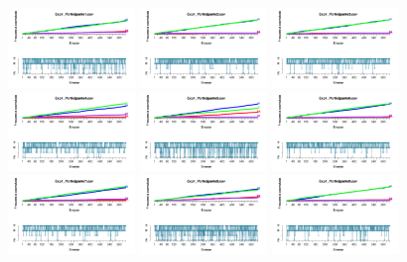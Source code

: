 \begin{figure}[th]
\centering
\includegraphics[width=0.30\textwidth]{Figures/Outcome_Exp1_P1} \includegraphics[width=0.30\textwidth]{Figures/Outcome_Exp1_P2} \includegraphics[width=0.30\textwidth]{Figures/Outcome_Exp1_P3}
\includegraphics[width=0.30\textwidth]{Figures/Outcome_Exp1_P4} \includegraphics[width=0.30\textwidth]{Figures/Outcome_Exp1_P5} \includegraphics[width=0.30\textwidth]{Figures/Outcome_Exp1_P6}
\includegraphics[width=0.30\textwidth]{Figures/Outcome_Exp1_P7} \includegraphics[width=0.30\textwidth]{Figures/Outcome_Exp1_P8} \includegraphics[width=0.30\textwidth]{Figures/Outcome_Exp1_P9}

\end{figure}

